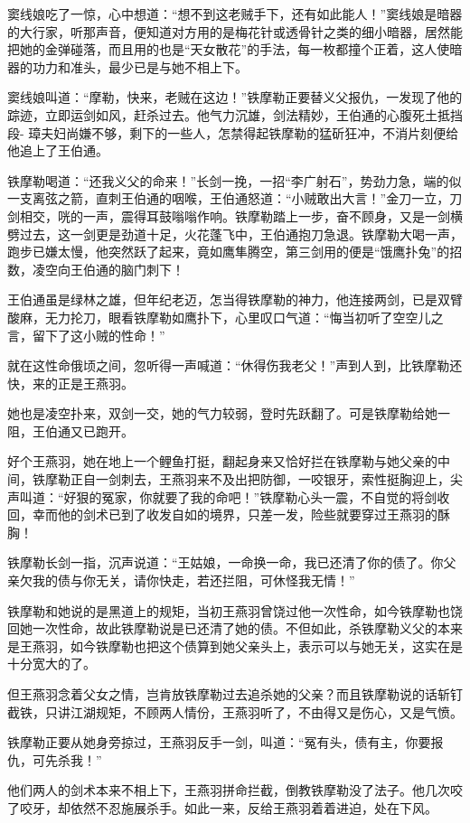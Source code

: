 \documentclass[12pt,oneside]{book}
\begin{document}
窦线娘吃了一惊，心中想道：``想不到这老贼手下，还有如此能人！''窦线娘是暗器的大行家，听那声音，便知道对方用的是梅花针或透骨针之类的细小暗器，居然能把她的金弹碰落，而且用的也是``天女散花''的手法，每一枚都撞个正着，这人使暗器的功力和准头，最少已是与她不相上下。

窦线娘叫道：``摩勒，快来，老贼在这边！''铁摩勒正要替义父报仇，一发现了他的踪迹，立即运剑如风，赶杀过去。他气力沉雄，剑法精妙，王伯通的心腹死土抵挡段-
璋夫妇尚嫌不够，剩下的一些人，怎禁得起铁摩勒的猛斫狂冲，不消片刻便给他追上了王伯通。

铁摩勒喝道：``还我义父的命来！''长剑一挽，一招``李广射石''，势劲力急，端的似一支离弦之箭，直刺王伯通的咽喉，王伯通怒道：``小贼敢出大言！''金刀一立，刀剑相交，咣的一声，震得耳鼓嗡嗡作响。铁摩勒踏上一步，奋不顾身，又是一剑横劈过去，这一剑更是劲道十足，火花蓬飞中，王伯通抱刀急退。铁摩勒大喝一声，跑步已嫌太慢，他突然跃了起来，竟如鹰隼腾空，第三剑用的便是``饿鹰扑兔''的招数，凌空向王伯通的脑门刺下！

王伯通虽是绿林之雄，但年纪老迈，怎当得铁摩勒的神力，他连接两剑，已是双臂酸麻，无力抡刀，眼看铁摩勒如鹰扑下，心里叹口气道：``悔当初听了空空儿之言，留下了这小贼的性命！''

就在这性命俄顷之间，忽听得一声喊道：``休得伤我老父！''声到人到，比铁摩勒还快，来的正是王燕羽。

她也是凌空扑来，双剑一交，她的气力较弱，登时先跃翻了。可是铁摩勒给她一阻，王伯通又已跑开。

好个王燕羽，她在地上一个鲤鱼打挺，翻起身来又恰好拦在铁摩勒与她父亲的中间，铁摩勒正自一剑刺去，王燕羽来不及出把防御，一咬银牙，索性挺胸迎上，尖声叫道：``好狠的冤家，你就要了我的命吧！''铁摩勒心头一震，不自觉的将剑收回，幸而他的剑术已到了收发自如的境界，只差一发，险些就要穿过王燕羽的酥胸！

铁摩勒长剑一指，沉声说道：``王姑娘，一命换一命，我已还清了你的债了。你父亲欠我的债与你无关，请你快走，若还拦阻，可休怪我无情！''

铁摩勒和她说的是黑道上的规矩，当初王燕羽曾饶过他一次性命，如今铁摩勒也饶回她一次性命，故此铁摩勒说是已还清了她的债。不但如此，杀铁摩勒义父的本来是王燕羽，如今铁摩勒也把这个债算到她父亲头上，表示可以与她无关，这实在是十分宽大的了。

但王燕羽念着父女之情，岂肯放铁摩勒过去追杀她的父亲？而且铁摩勒说的话斩钉截铁，只讲江湖规矩，不顾两人情份，王燕羽听了，不由得又是伤心，又是气愤。

铁摩勒正要从她身旁掠过，王燕羽反手一剑，叫道：``冤有头，债有主，你要报仇，可先杀我！''

他们两人的剑术本来不相上下，王燕羽拼命拦截，倒教铁摩勒没了法子。他几次咬了咬牙，却依然不忍施展杀手。如此一来，反给王燕羽着着进迫，处在下风。
\end{document}
